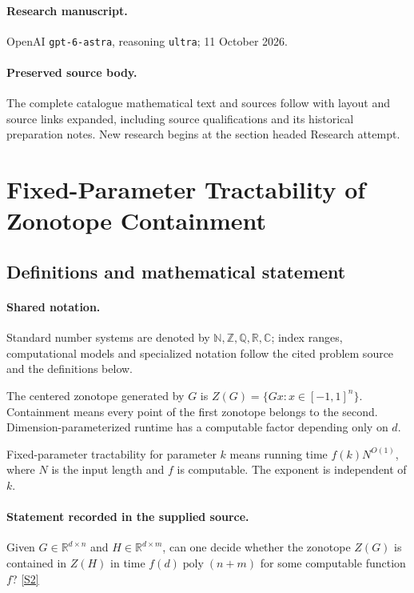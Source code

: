 \documentclass[11pt]{article}
\begin{document}
\paragraph{Research manuscript.} OpenAI \texttt{gpt-6-astra}, reasoning \texttt{ultra}; 11 October 2026.
\paragraph{Preserved source body.} The complete catalogue mathematical text and sources follow with layout and source links expanded, including source qualifications and its historical preparation notes. New research begins at the section headed Research attempt.

\section{Fixed-Parameter Tractability of Zonotope Containment}\label{statement}

\subsection{Definitions and mathematical statement}

\paragraph{Shared notation.}Standard number systems are denoted by $\mathbb N,\mathbb Z,\mathbb Q,\mathbb R,\mathbb C$; index ranges, computational models and specialized notation follow the cited problem source and the definitions below.


The centered zonotope generated by $G$ is $Z(G)=\{Gx:x\in[-1,1]^n\}$. Containment means every point of the first zonotope belongs to the second. Dimension-parameterized runtime has a computable factor depending only on $d$.

Fixed-parameter tractability for parameter $k$ means running time $f(k)N^{O(1)}$, where $N$ is the input length and $f$ is computable. The exponent is independent of $k$.
\paragraph{Statement recorded in the supplied source.}
Given $G\in\mathbb R^{d\times n}$ and $H\in\mathbb R^{d\times m}$, can one decide whether the zonotope $Z(G)$ is contained in $Z(H)$ in time $f(d)\operatorname{poly}(n+m)$ for some computable function $f$? \href{https://doi.org/10.4171/owr/2024/50}{[S2]}
\end{document}
